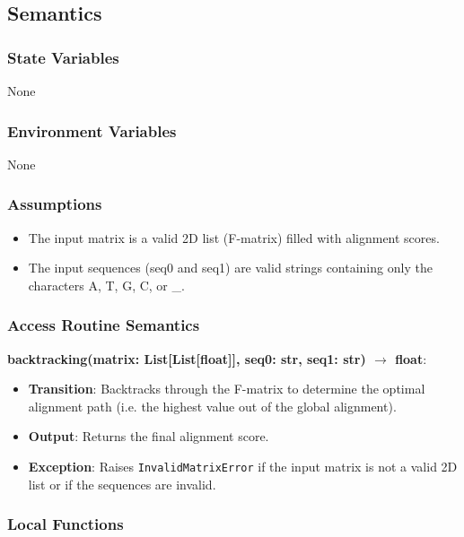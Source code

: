 \documentclass[12pt, titlepage]{article}
\begin{document}
\subsection{Semantics}

\subsubsection{State Variables}

None

\subsubsection{Environment Variables}

None

\subsubsection{Assumptions}

\begin{itemize}
    \item The input matrix is a valid 2D list (F-matrix) filled with alignment scores.
    \item The input sequences (seq0 and seq1) are valid strings containing only the characters A, T, G, C, or \_.
\end{itemize}

\subsubsection{Access Routine Semantics}

\noindent \textbf{backtracking(matrix: List[List[float]], seq0: str, seq1: str) $\rightarrow$ float}:
\begin{itemize}
    \item \textbf{Transition}: Backtracks through the F-matrix to determine the optimal alignment path (i.e. the highest value out of the global alignment).
    \item \textbf{Output}: Returns the final alignment score.
    \item \textbf{Exception}: Raises \texttt{InvalidMatrixError} if the input matrix is not a valid 2D list or if the sequences are invalid.
\end{itemize}

\subsubsection{Local Functions}
\end{document}
